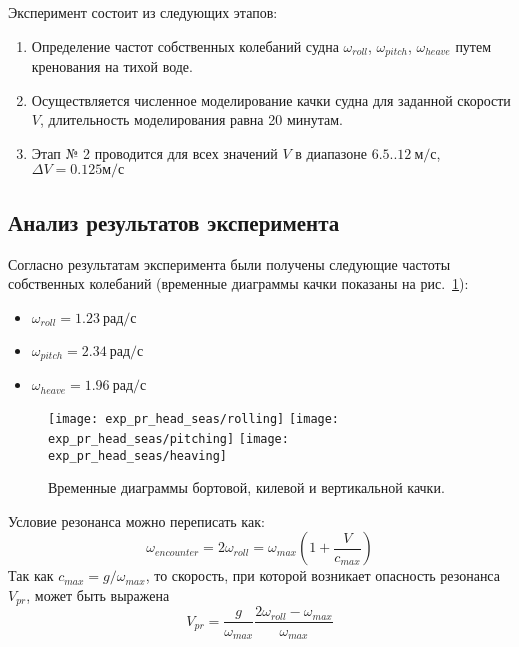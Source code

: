 Эксперимент состоит из следующих этапов:
\begin{enumerate}
	\item	Определение частот собственных колебаний судна 
			$\omega_{roll}$, $\omega_{pitch}$, $\omega_{heave}$ путем кренования на тихой воде.
	\item	Осуществляется численное моделирование качки судна для заданной скорости $V$, длительность моделирования равна 20 минутам.
	\item	Этап № 2	проводится для всех значений $V$ в диапазоне 
			$6.5..12\ \text{м/с}$, $\Delta V=0.125 \text{м/с}$ 
\end{enumerate}

\subsection{Анализ результатов эксперимента}

Согласно результатам эксперимента были получены следующие частоты собственных колебаний (временные диаграммы качки показаны на рис.~\ref{exp_pr2_rolling}):
\begin{itemize}
	\item	$ \omega_{roll} = 1.23 \ \text{рад/с}$
	\item	$ \omega_{pitch} = 2.34 \ \text{рад/с}$
	\item	$ \omega_{heave} = 1.96 \ \text{рад/с}$
\end{itemize}

\begin{figure}[ht]
	\begin{center}
	\texttt{[image: exp\_pr\_head\_seas/rolling]}
	\texttt{[image: exp\_pr\_head\_seas/pitching]}
	\texttt{[image: exp\_pr\_head\_seas/heaving]}
	\end{center}
	\caption{Временные диаграммы бортовой, килевой и вертикальной качки.}
	\label{exp_pr2_rolling}
\end{figure}

Условие резонанса можно переписать как:
\begin{equation}
	\omega_{encounter} = 2 \omega_{roll} = \omega_{max} \left(  1 + \frac{V}{c_{max}}  \right)
\end{equation}
Так как $c_{max} = g / \omega_{max}$, то скорость, при которой возникает опасность резонанса $V_{pr}$, может быть выражена
\begin{equation}
	V_{pr} = \frac{g}{\omega_{max}} \frac{ 2 \omega_{roll} - \omega_{max} }{ \omega_{max}}
\end{equation}

